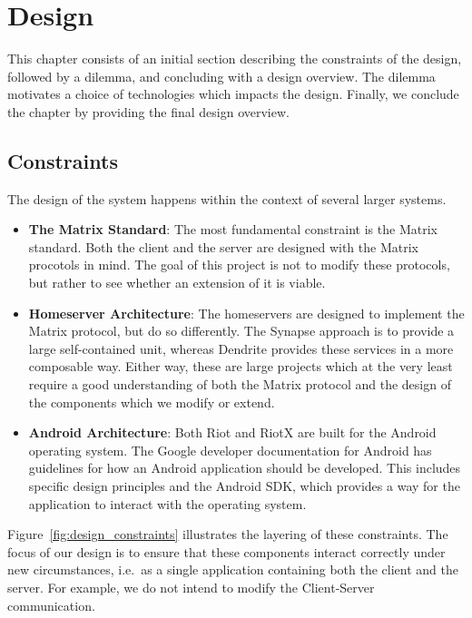 \chapter{Design}\label{chp:design}
This chapter consists of an initial section describing the constraints of the design, followed by a dilemma, and concluding with a design overview.
The dilemma motivates a choice of technologies which impacts the design.
Finally, we conclude the chapter by providing the final design overview.

\section{Constraints}
The design of the system happens within the context of several larger systems.
\begin{itemize}
	\item{
	      \textbf{The Matrix Standard}:
	      The most fundamental constraint is the Matrix standard.
	      Both the client and the server are designed with the Matrix procotols in mind.
	      The goal of this project is not to modify these protocols, but rather to see whether an extension of it is viable.
	      }
	\item{
	      \textbf{Homeserver Architecture}:
	      The homeservers are designed to implement the Matrix protocol, but do so differently.
	      The Synapse approach is to provide a large self-contained unit, whereas Dendrite provides these services in a more composable way.
	      Either way, these are large projects which at the very least require a good understanding of both the Matrix protocol and the design of the components which we modify or extend.
	      }
	\item{
	      \textbf{Android Architecture}:
	      Both Riot and RiotX are built for the Android operating system.
	      The Google developer documentation for Android has guidelines for how an Android application should be developed.
	      This includes specific design principles and the Android \ac{SDK}, which provides a way for the application to interact with the operating system.
	      }
\end{itemize}

Figure~\ref{fig:design_constraints} illustrates the layering of these constraints.
The focus of our design is to ensure that these components interact correctly under new circumstances, i.e.~as a single application containing both the client and the server.
For example, we do not intend to modify the Client-Server communication.

